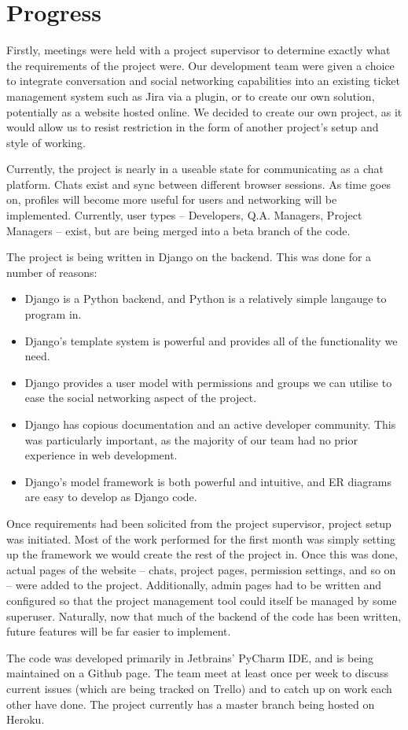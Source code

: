 \documentclass[10pt]{article}
\begin{document}
\section{Progress} \par
Firstly, meetings were held with a project supervisor to determine exactly what the requirements of the project were. Our development team were given a choice to integrate conversation and social networking capabilities into an existing ticket management system such as Jira via a plugin, or to create our own solution, potentially as a website hosted online. We decided to create our own project, as it would allow us to resist restriction in the form of another project's setup and style of working. \par
Currently, the project is nearly in a useable state for communicating as a chat platform. Chats exist and sync between different browser sessions. As time goes on, profiles will become more useful for users and networking will be implemented. Currently, user types -- Developers, Q.A. Managers, Project Managers -- exist, but are being merged into a beta branch of the code. \par 
The project is being written in Django on the backend. This was done for a number of reasons:
\begin{itemize} 
\item Django is a Python backend, and Python is a relatively simple langauge to program in. 
\item Django's template system is powerful and provides all of the functionality we need.
\item Django provides a user model with permissions and groups we can utilise to ease the social networking aspect of the project.
\item Django has copious documentation and an active developer community. This was particularly important, as the majority of our team had no prior experience in web development.
\item Django's model framework is both powerful and intuitive, and ER diagrams are easy to develop as Django code. 
\end{itemize} \par
Once requirements had been solicited from the project supervisor, project setup was initiated. Most of the work performed for the first month was simply setting up the framework we would create the rest of the project in. Once this was done, actual pages of the website -- chats, project pages, permission settings, and so on -- were added to the project. Additionally, admin pages had to be written and configured so that the project management tool could itself be managed by some superuser. Naturally, now that much of the backend of the code has been written, future features will be far easier to implement. \par
The code was developed primarily in Jetbrains' PyCharm IDE, and is being maintained on a Github page. The team meet at least once per week to discuss current issues (which are being tracked on Trello) and to catch up on work each other have done. The project currently has a master branch being hosted on Heroku.\par 
\end{document}

